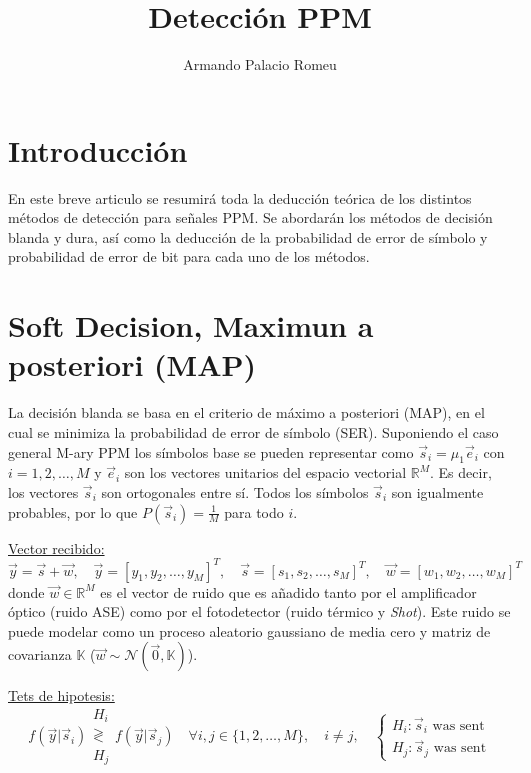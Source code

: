\documentclass{article}
\title{Detección PPM}
\author{Armando Palacio Romeu}
\begin{document}
\maketitle

\section{Introducción}
    En este breve articulo se resumirá toda la deducción teórica de los distintos métodos de detección para 
    señales PPM. Se abordarán los métodos de decisión blanda y dura, así como la deducción de la probabilidad de error de símbolo
    y probabilidad de error de bit para cada uno de los métodos. 

\section{Soft Decision, Maximun a posteriori (MAP)}
    La decisión blanda se basa en el criterio de máximo a posteriori (MAP), en el cual se minimiza la 
    probabilidad de error de símbolo (SER). Suponiendo el caso general M-ary PPM los símbolos base se 
    pueden representar como $\vec{s}_i = \mu_1 \vec{e}_i$ con $i = 1,2,\dots,M$ y 
    $\vec{e}_i$ son los vectores unitarios del espacio vectorial $\mathbb{R}^M$. Es decir,
    los vectores $\vec{s}_i$ son ortogonales entre sí. Todos los símbolos $\vec{s}_i$ son igualmente 
    probables, por lo que $P(\vec{s}_i) = \frac{1}{M}$ para todo $i$.

    \underline{Vector recibido:} 
    \begin{equation}
        \vec{y} = \vec{s} + \vec{w}, \quad \vec{y} = [y_1,y_2,\dots,y_M]^T, \quad \vec{s} = [s_1,s_2,\dots,s_M]^T, \quad \vec{w} = [w_1,w_2,\dots,w_M]^T
    \end{equation}
    donde $\vec{w}\in \mathbb{R}^M$ es el vector de ruido que es añadido tanto por el amplificador 
    óptico (ruido ASE) como por el fotodetector (ruido térmico y \textit{Shot}). Este ruido se
    puede modelar como un proceso aleatorio gaussiano de media cero y matriz de covarianza $\mathbb{K}$ 
    ($\vec{w}\sim \mathcal{N}(\vec{0},\mathbb{K} )$). 

    \underline{Tets de hipotesis:}
    \begin{equation}
        f(\vec{y}|\vec{s}_i) 
        \begin{array}{c}
            H_i \\
            \gtrless \\
            H_j
        \end{array}
        f(\vec{y}|\vec{s}_j) \quad \forall i,j \in \{1,2,\dots,M\}, \quad i\neq j, \quad
        \begin{cases}
            H_i: \vec{s}_i \text{  was sent} \\
            H_j: \vec{s}_j \text{  was sent}
        \end{cases}
    \end{equation}
\end{document}
